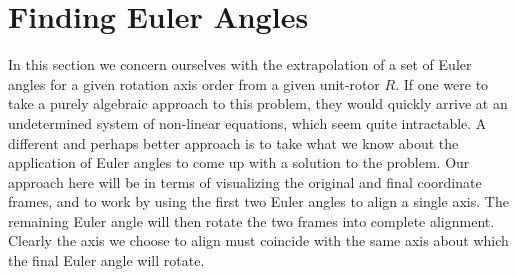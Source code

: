 \documentclass[12pt]{article}
\begin{document}
\section*{Finding Euler Angles}

In this section we concern ourselves with the extrapolation of a set of Euler angles for
a given rotation axis order from a given unit-rotor $R$.  If one were to take a purely algebraic
approach to this problem, they would quickly arrive at an undetermined system of non-linear equations,
which seem quite intractable.  A different and perhaps better approach is to take what we know
about the application of Euler angles to come up with a solution to the problem.
Our approach here will be in terms of visualizing the original and final coordinate frames,
and to work by using the first two Euler angles to align a single axis.  The remaining Euler angle
will then rotate the two frames into complete alignment.  Clearly the axis we choose to align must
coincide with the same axis about which the final Euler angle will rotate.
\end{document}
